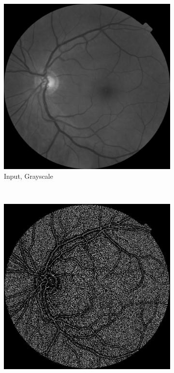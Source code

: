 \documentclass{scrartcl}
\begin{document}
\begin{figure}[htb]
\centering
\begin{subfigure}{0.25\textwidth}
\centering
    \includegraphics[width=1\textwidth]{saliency_gt}
    \caption{Input, Grayscale}
\end{subfigure}~
\begin{subfigure}{0.25\textwidth}
\centering
    \includegraphics[width=1\textwidth]{saliency_vessels}

\end{subfigure}
\end{figure}
\end{document}
